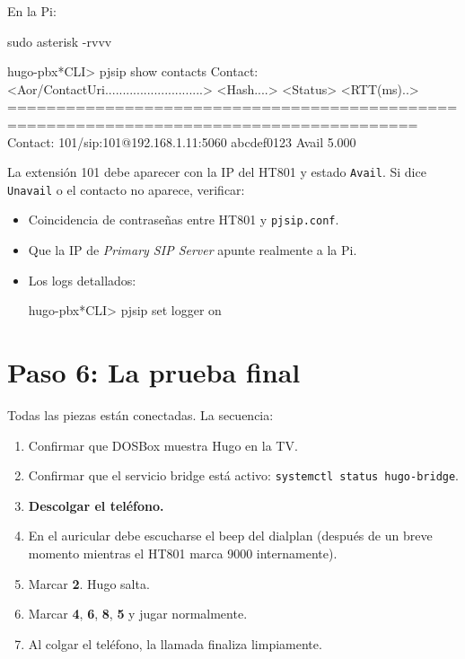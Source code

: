 En la Pi:

\begin{shellcode}
sudo asterisk -rvvv
\end{shellcode}

\begin{plaincode}
hugo-pbx*CLI> pjsip show contacts
 Contact:  <Aor/ContactUri............................>  <Hash....> <Status> <RTT(ms)..>
========================================================================================
 Contact:  101/sip:101@192.168.1.11:5060                  abcdef0123 Avail        5.000
\end{plaincode}

La extensión 101 debe aparecer con la IP del HT801 y estado \texttt{Avail}. Si dice \texttt{Unavail} o el contacto no aparece, verificar:

\begin{itemize}
  \item Coincidencia de contraseñas entre HT801 y \texttt{pjsip.conf}.
  \item Que la IP de \emph{Primary SIP Server} apunte realmente a la Pi.
  \item Los logs detallados:
  \begin{shellcode}
hugo-pbx*CLI> pjsip set logger on
  \end{shellcode}
\end{itemize}

\section{Paso 6: La prueba final}

Todas las piezas están conectadas. La secuencia:

\begin{enumerate}
  \item Confirmar que DOSBox muestra Hugo en la TV.
  \item Confirmar que el servicio bridge está activo: \texttt{systemctl status hugo-bridge}.
  \item \textbf{Descolgar el teléfono.}
  \item En el auricular debe escucharse el beep del dialplan (después de un breve momento mientras el HT801 marca 9000 internamente).
  \item Marcar \textbf{2}. Hugo salta.
  \item Marcar \textbf{4}, \textbf{6}, \textbf{8}, \textbf{5} y jugar normalmente.
  \item Al colgar el teléfono, la llamada finaliza limpiamente.
\end{enumerate}

